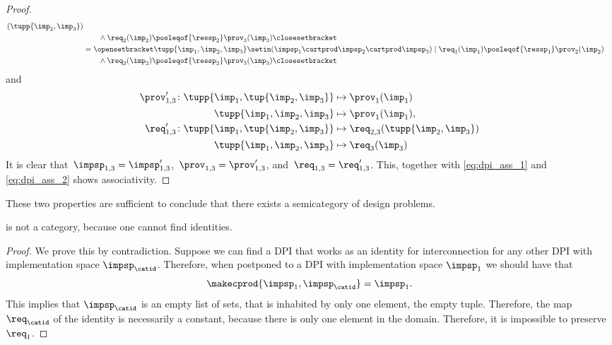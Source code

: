 {\begin{proof}
\begin{equation}
\begin{aligned}
                (\tupp{\imp_{2}, \imp_{3}}) \\
                              & \qquad \wedge \req_2(\imp_2)\posleqof{\ressp_2}\prov_3(\imp_3)\closesetbracket \\
                              & =\opensetbracket  \tupp{\imp_{1}, \imp_{2}, \imp_{3}} \setin (\impsp_{1} \cartprod \impsp_{2}\cartprod \impsp_{3})\mid\req_{1}(\imp_{1})\posleqof{\ressp_{1}}\prov_{2}(\imp_2) \\
                              & \qquad \wedge \req_2(\imp_2)\posleqof{\ressp_2}\prov_3(\imp_3)\closesetbracket
            \end{aligned}
        \end{equation}
        and
        \begin{equation}
            \begin{aligned}
                \prov'_{1,3} \colon  \tupp{\imp_{1}, \tup{\imp_{2}, \imp_{3}}} & \mapsto\prov_{1}(\imp_{1}) \\
                \tupp{\imp_{1}, \imp_{2}, \imp_{3}}                            & \mapsto\prov_{1}(\imp_{1}), \\
                \req'_{1,3} \colon  \tupp{\imp_{1}, \tup{\imp_{2}, \imp_{3}}}  & \mapsto\req_{2,3}(\tupp{\imp_{2}, \imp_{3}}) \\
                \tupp{\imp_{1}, \imp_{2}, \imp_{3}}                            & \mapsto \req_{3}(\imp_{3})
            \end{aligned}
        \end{equation}
        It is clear that~$\impsp_{1,3}=\impsp'_{1,3}$,~$\prov_{1,3}=\prov'_{1,3}$, and~$\req_{1,3}=\req'_{1,3}$.
        This, together with \cref{eq:dpi_ass_1} and \cref{eq:dpi_ass_2} shows associativity.
    \end{proof}
}

These two properties are sufficient to conclude that there exists a semicategory of design problems.


\begin{lemma}
    \DPI is not a category, because one cannot find identities.
\end{lemma}
\begin{proof}
    We prove this by contradiction.
    Suppose we can find a DPI that works as an identity for interconnection for any other DPI with implementation space $\impsp_{\catid}$.
    Therefore, when postponed to a DPI with implementation space $\impsp_1$ we should have that
    \begin{equation}
        \makecprod{\impsp_1, \impsp_{\catid}} = \impsp_1.
    \end{equation}
    This implies that $\impsp_{\catid}$ is an empty list of sets, that is inhabited by only one element, the empty tuple.
    Therefore, the map $\req_{\catid}$ of the identity is necessarily a constant, because there is only one element in the domain.
    Therefore, it is impossible to preserve $\req_1$.
\end{proof}

